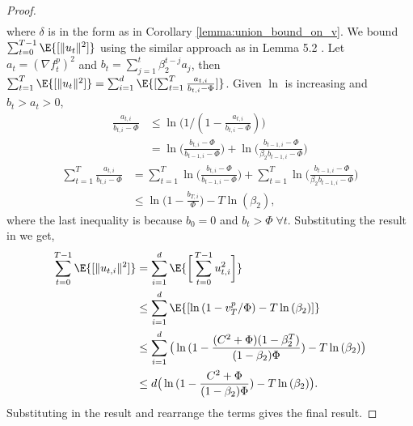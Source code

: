 \documentclass[letterpaper]{article} %
\begin{document}
\begin{proof}
\begin{align*}
    \end{align*}
    where $\delta$ is in the form as in Corollary \ref{lemma:union_bound_on_v}.
    We bound $\sum_{t=0}^{T-1} \E{[\lVert u_t \rVert^2]}$ using the similar approach as in Lemma 5.2 \citep{défossez2022simple}. Let $a_t=(\nabla f_t^{p})^2$ and $b_t = \sum_{j=1}^{t}\beta_2^{t-j}a_j$, then $\sum_{t=1}^{T} \E{[\lVert u_t \rVert^2]} = \sum_{i=1}^{d} \E{[\sum_{t=1}^{T} \frac{a_{t, i}}{b_{t,i} - \Phi}]}$. Given $\ln$ is increasing and $b_t > a_t > 0$,
    \begin{align*}
        \frac{a_{t, i}}{b_{t,i} - \Phi} &\leq \ln{\big(1/(1-\frac{a_{t,i}}{b_{t,i}-\Phi})\big)} \\
        &= \ln{\big( \frac{b_{t,i}-\Phi}{b_{t-1,i}-\Phi} \big)} + \ln{\big( \frac{b_{t-1,i}-\Phi}{\beta_2 b_{t-1,i}-\Phi} \big)}
    \end{align*}
    \begin{align*}
        \sum_{t=1}^{T} \frac{a_{t, i}}{b_{t,i} - \Phi} &=  \sum_{t=1}^{T} \ln{\big( \frac{b_{t,i}-\Phi}{b_{t-1,i}-\Phi} \big)} +  \sum_{t=1}^{T} \ln{\big( \frac{b_{t-1,i}-\Phi}{\beta_2 b_{t-1,i}-\Phi} \big)} \\
        &\leq \ln{\big( 1-\frac{b_{T,i}}{\Phi} \big)} - T\ln{(\beta_2)},
    \end{align*}
    where the last inequality is because $b_{0}=0$ and $b_t > \Phi \; \forall t$.
    Substituting the result in we get,
    \begin{align*}
        \sum_{t=0}^{T-1} \E{[\lVert u_{t, i} \rVert^2]} &= \sum_{i=1}^{d} \E{\bigg[ \sum_{t=0}^{T-1} u_{t, i}^2 \bigg]} \\ &\leq \sum_{i=1}^{d} \E{[\ln{(1-v_{T}^p/\Phi)} - T\ln{(\beta_2)}]} \\
        &\leq \sum_{i=1}^{d} \big(\ln{(1-\frac{(C^2+\Phi)(1-\beta_2^{T})}{(1-\beta_2)\Phi}) - T\ln{(\beta_2)}}\big)\\
        &\leq d\big(\ln{(1-\frac{C^2+\Phi}{(1-\beta_2)\Phi}) - T\ln{(\beta_2)}}\big).
    \end{align*}
    Substituting in the result and rearrange the terms gives the final result.
\end{proof}
\end{document}
